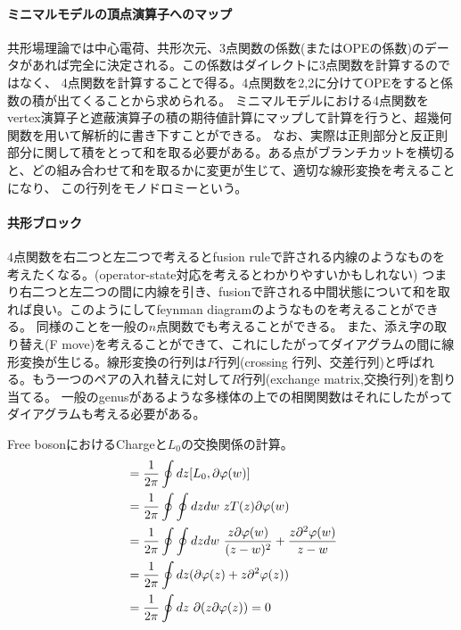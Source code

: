 \documentclass[11pt, aps, longbibliography]{article}
\numberwithin{equation}{section}
\begin{document}
    \paragraph{ミニマルモデルの頂点演算子へのマップ}
    共形場理論では中心電荷、共形次元、3点関数の係数(またはOPEの係数)のデータがあれば完全に決定される。この係数はダイレクトに3点関数を計算するのではなく、
    4点関数を計算することで得る。4点関数を2,2に分けてOPEをすると係数の積が出てくることから求められる。
    ミニマルモデルにおける4点関数をvertex演算子と遮蔽演算子の積の期待値計算にマップして計算を行うと、超幾何関数を用いて解析的に書き下すことができる。
    なお、実際は正則部分と反正則部分に関して積をとって和を取る必要がある。ある点がブランチカットを横切ると、どの組み合わせて和を取るかに変更が生じて、適切な線形変換を考えることになり、
    この行列をモノドロミーという。

    \paragraph{共形ブロック}
    4点関数を右二つと左二つで考えるとfusion ruleで許される内線のようなものを考えたくなる。(operator-state対応を考えるとわかりやすいかもしれない)
    つまり右二つと左二つの間に内線を引き、fusionで許される中間状態について和を取れば良い。このようにしてfeynman diagramのようなものを考えることができる。
    同様のことを一般の$n$点関数でも考えることができる。
    また、添え字の取り替え(F move)を考えることができて、これにしたがってダイアグラムの間に線形変換が生じる。線形変換の行列は$F$行列(crossing 行列、交差行列)と呼ばれる。もう一つのペアの入れ替えに対して$R$行列(exchange matrix,交換行列)を割り当てる。
    一般のgenusがあるような多様体の上での相関関数はそれにしたがってダイアグラムも考える必要がある。



    Free bosonにおけるChargeと$L_0$の交換関係の計算。
    \begin{align}
        [L_0, Q] &= \frac{1}{2\pi} \oint dz [L_0, \partial \varphi(w)] \notag \\
        &= \frac{1}{2\pi} \oint \oint dz dw \ z T(z)\partial \varphi(w) \notag \\
        &= \frac{1}{2\pi} \oint \oint dz dw \  \frac{z\partial \varphi(w)}{(z-w)^2} + \frac{z\partial^2 \varphi(w)}{z-w} \notag \\
        &= \frac{1}{2\pi} \oint dz  (\partial \varphi(z) + z\partial^2 \varphi(z)) \notag \\
        &= \frac{1}{2\pi} \oint dz \  \partial(z\partial \varphi(z)) = 0
    \end{align}
\end{document}
